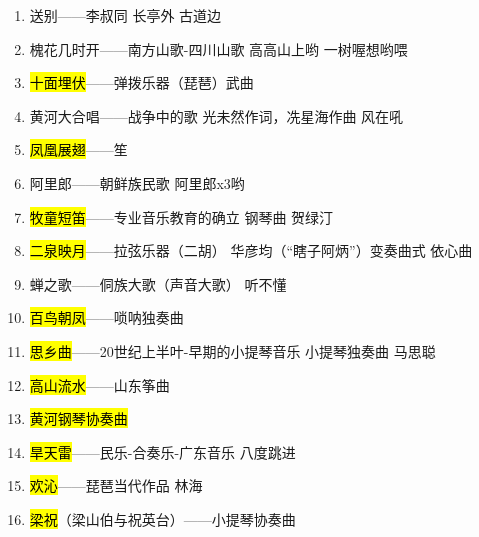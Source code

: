 \documentclass[
]{article}
\providecommand{\tightlist}{%
  \setlength{\itemsep}{0pt}\setlength{\parskip}{0pt}}
\begin{document}
\begin{enumerate}
\tightlist
\item
  送别------李叔同 长亭外 古道边
\item
  槐花几时开------南方山歌-四川山歌 高高山上哟 一树喔想哟喂
\item
  \hl{\mbox{十面埋伏}}------弹拨乐器（琵琶）武曲
\item
  黄河大合唱------战争中的歌 光未然作词，冼星海作曲 风在吼
\item
  \hl{\mbox{凤凰展翅}}------笙
\item
  阿里郎------朝鲜族民歌 阿里郎x3哟
\item
  \hl{\mbox{牧童短笛}}------专业音乐教育的确立 钢琴曲 贺绿汀
\item
  \hl{\mbox{二泉映月}}------拉弦乐器（二胡） 华彦均（``瞎子阿炳''）变奏曲式
  依心曲
\item
  蝉之歌------侗族大歌（声音大歌） 听不懂
\item
  \hl{\mbox{百鸟朝凤}}------唢呐独奏曲
\item
  \hl{\mbox{思乡曲}}------20世纪上半叶-早期的小提琴音乐 小提琴独奏曲 马思聪
\item
  \hl{\mbox{高山流水}}------山东筝曲
\item
  \hl{\mbox{黄河钢琴协奏曲}}
\item
  \hl{\mbox{旱天雷}}------民乐-合奏乐-广东音乐 八度跳进
\item
  \hl{\mbox{欢沁}}------琵琶当代作品 林海
\item
  \hl{\mbox{梁祝}}（梁山伯与祝英台）------小提琴协奏曲
\end{enumerate}
\end{document}
